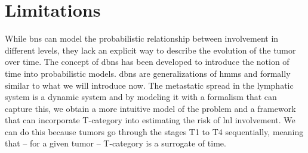 \documentclass[\relativeRoot/main.tex]{subfiles}
\begin{document}
\section{Limitations}
\label{sec:previous_work:limitations}

While \glspl{bn} can model the probabilistic relationship between involvement in different levels, they lack an explicit way to describe the evolution of the tumor over time. The concept of \glspl{dbn} has been developed to introduce the notion of time into probabilistic models. \Glspl{dbn} are generalizations of \glspl{hmm} and formally similar to what we will introduce now. The metastatic spread in the lymphatic system is a dynamic system and by modeling it with a formalism that can capture this, we obtain a more intuitive model of the problem and a framework that can incorporate T-category into estimating the risk of \gls{lnl} involvement. We can do this because tumors go through the stages T1 to T4 sequentially, meaning that -- for a given tumor -- T-category is a surrogate of time.
\end{document}
